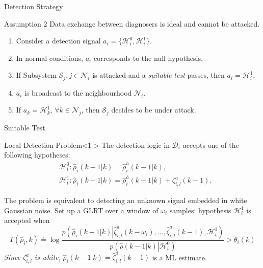 \documentclass[presentation]{beamer}
\begin{document}
\begin{frame}{Detection Strategy}
\begin{block}{Assumption 2}
Data exchange between diagnosers is ideal and cannot be attacked.
\end{block}
\vfill
\begin{enumerate}
    \item Consider a detection signal $a_i = \{\mathcal H_i^0, \mathcal H_i^1\}$.
    \item In normal conditions, $a_i$ corresponds to the null hypothesis.
    \item If Subsystem $\mathcal S_j, j \in \mathcal N_i$ is attacked and a \emph{suitable test} passes, then $a_i = \mathcal H_i^1 $.
    \item $a_i$ is broadcast to the neighbourhood $\mathcal N_i$.
    \item If $a_k = \mathcal H_k^1,\, \forall k \in \mathcal N_j$, then $\mathcal S_j$ decides to be under attack.
\end{enumerate}
\end{frame}

\begin{frame}{Suitable Test}
\begin{block}{Local Detection Problem}<1->
    The detection logic in $\mathcal{D}_i$ accepts one of the following hypotheses:
    \begin{equation*}
        \begin{aligned}
            &\mathcal{H}_i^0: \hat \rho_i(k-1|k) = \hat\rho_i^h(k-1|k), \\
            &\mathcal{H}_i^1: \hat \rho_i(k-1|k) = \hat\rho_i^h(k-1|k) + \zeta_{i,l}^a(k-1).
        \end{aligned}
    \end{equation*}
\end{block}

\bigskip
{}
The problem is equivalent to detecting an unknown signal embedded in white Gaussian noise.
Set up a GLRT over a window of $\omega_i$ samples: hypothesis $\mathcal H_i^1$ is accepted when 
\small{
    $$ T(\hat\rho_i,k) \doteq \log \frac{p\left(\hat \rho_i(k-1|k) \left| \hat \zeta_{i,l}^a(k-\omega_i), \dots, \hat \zeta_{i,l}^a(k-1), \mathcal H_i^1\right)\right.}{p\left(\hat \rho(k-1|k) \left| \mathcal H_i^0\right)\right.} > \theta_i(k) $$
}
\emph{Since $\zeta_{i,l}^a$ is white}, $\hat \rho_i(k-1|k) = \hat\zeta_{i,l}^a(k-1)$ is a ML estimate.
\end{frame}
\end{document}
